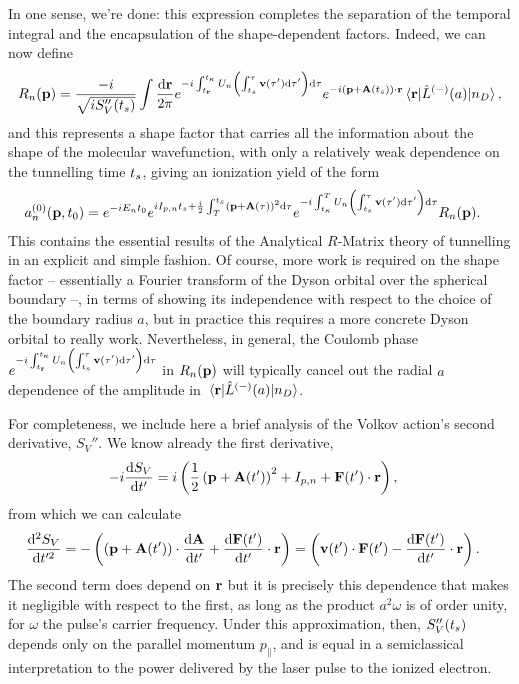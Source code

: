 In one sense, we're done: this expression completes the separation of the temporal integral and the encapsulation of the shape-dependent factors. Indeed, we can now define
\begin{equation}
R_n(\vbp)
=
\frac{-i }{\sqrt{iS_V''(\ts)}}
\int\frac{\d\vbr}{2\pi}
e^{-i\int_\tvr^\tk U_n\left(\int_{ \ts}^\tau \vb{v}(\tau')\d\tau'\right) \d\tau}
e^{-i\left(\vbp+\vba(\ts)\right)\cdot\vb{r}}
\matrixel{\vbr}{\hat{L}^{(-)}(a)}{n_D},
\label{e2-shape-factor-definition}
\end{equation}
and this represents a shape factor that carries all the information about the shape of the molecular wavefunction, with only a relatively weak dependence on the tunnelling time ${t_s}$, giving an ionization yield of the form
\begin{align}
a_n^{(0)}(\vb{p},{t_0})
& =
e^{-iE_n{t_0}}
e^{iI_{p,n} {t_s} + \frac{i}{2} \int_T^{{t_s}}\left(\vb{p}+\vb{A}(\tau)\right)^2\mathrm{d}\tau }
e^{-i\int_{t_\kappa}^T U_n\left(\int_{ {t_s}}^\tau \vb{v}(\tau')\mathrm{d}\tau'\right) \mathrm{d}\tau}
R_n(\vb{p})
.
\label{e2-ionization-yield-with-shape-factor}
\end{align}
This contains the essential results of the Analytical $R$-Matrix theory of tunnelling in an explicit and simple fashion. Of course, more work is required on the shape factor -- essentially a Fourier transform of the Dyson orbital over the spherical boundary --, in terms of showing its independence with respect to the choice of the boundary radius $a$, but in practice this requires a more concrete Dyson orbital to really work. Nevertheless, in general, the Coulomb phase $e^{-i\int_{t_{\vb{r}}}^{t_\kappa} U_n\left(\int_{ {t_s}}^\tau \vb{v}(\tau')\mathrm{d}\tau'\right) \mathrm{d}\tau}$ in $R_n(\vb{p})$ will typically cancel out the radial $a$ dependence of the amplitude in $\matrixel{\vbr}{\hat{L}^{(-)}(a)}{n_D}$.



For completeness, we include here a brief analysis of the Volkov action's second derivative, $S_V''$. We know already the first derivative, 
\begin{align}
-i\frac{\mathrm{d} S_V}{\mathrm{d} t'}
 & = i\left(\frac{1}{2} \left(\vb{p}+\vb{A}(t')\right)^2+ I_{p,n} + \vb{F}(t')\cdot\vb{r}\right),
\end{align}
from which we can calculate
\begin{align}
\frac{\mathrm{d}^2 S_V}{\mathrm{d} t'^2}
& = 
-\left(\left(\vb{p}+\vb{A}(t')\right)\cdot\frac{\mathrm{d}\vb{A}}{\mathrm{d} t'} + \frac{\mathrm{d}\vb{F}(t')}{\mathrm{d} t'}\cdot\vb{r}\right)
= 
\left(\vb{v}(t')\cdot\vb{F}(t') - \frac{\mathrm{d}\vb{F}(t')}{\mathrm{d} t'}\cdot\vb{r}\right).
\end{align}
The second term does depend on $\vb{r}$ but it is precisely this dependence that makes it negligible with respect to the first, as long as the product $a^2\omega$ is of order unity, for $\omega$ the pulse's carrier frequency. Under this approximation, then, $S_V''({t_s})$ depends only on the parallel momentum $p_\parallel$, and is equal in a semiclassical interpretation to the power delivered by the laser pulse to the ionized electron.





